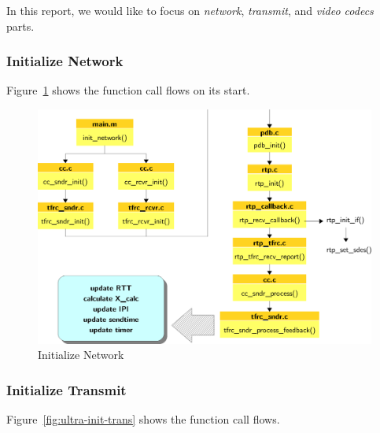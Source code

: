 In this report, we would like to focus on \emph{network}, \emph{transmit},
and \emph{video codecs} parts.

\subsubsection{\label{sssec:ultra-init-net}Initialize Network}

Figure~\ref{fig:ultra-init-net} shows the function call flows on its start.

\begin{figure}[!h]
\begin{center}
\includegraphics[scale=.6]{./img/ultra-init-net}
\caption{\label{fig:ultra-init-net}Initialize Network}
\end{center}
\end{figure}

\subsubsection{\label{sssec:ultra-init-trans}Initialize Transmit}

Figure~\ref{fig:ultra-init-trans} shows the function call flows.

